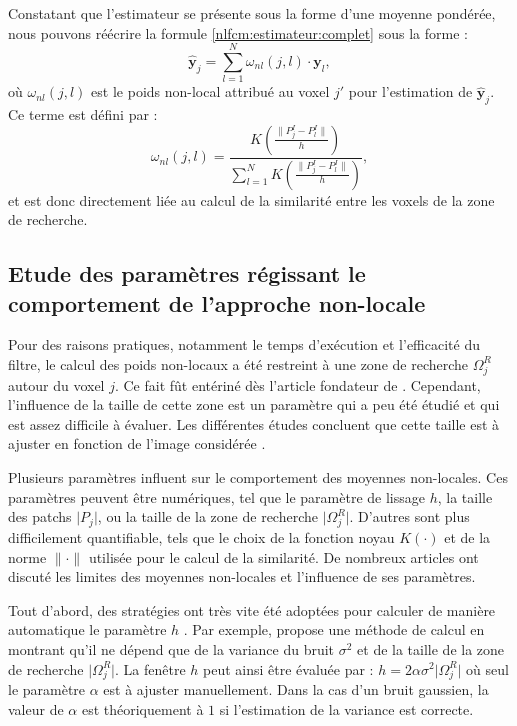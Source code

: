 Constatant que l'estimateur se présente sous la forme d'une moyenne pondérée, nous pouvons réécrire la formule \ref{nlfcm:estimateur:complet} sous la forme :
\begin{equation}
\mathbf{\hat{y}}_{j} = \sum_{l = 1}^{N}\omega_{nl}(j,l) \cdotp \mathbf{y}_{l} \label{nlfcm:estimateur:court},
\end{equation}
où $\omega_{nl}(j,l)$ est le poids non-local attribué au voxel $j'$ pour l'estimation de $\mathbf{\hat{y}}_{j}$. 
Ce terme est défini par :
\begin{equation}
\omega_{nl}(j,l) = \frac{K \left( \frac{\lVert P^{I}_{j} - P^{I}_{l} \rVert}{h} \right)}{\sum_{l=1}^{N} K \left(\frac{ \lVert P^{I}_{j} - P^{I}_{l} \rVert}{h} \right)} \label{nlfcm:poids:definition},
\end{equation}
et est donc directement liée au calcul de la similarité entre les voxels de la zone de recherche.

\subsection{Etude des paramètres régissant le comportement de l'approche non-locale}

Pour des raisons pratiques, notamment le temps d'exécution et l'efficacité du filtre, le calcul des poids non-locaux a été restreint à une zone de recherche $\Omega_{j}^{R}$ autour du voxel $j$.
Ce fait fût entériné dès l'article fondateur de \cite{Buades:MMS:2005}.
Cependant, l'influence de la taille de cette zone est un paramètre qui a peu été étudié et qui est assez difficile à évaluer.
Les différentes études concluent que cette taille est à ajuster en fonction de l'image considérée \cite{Salmon:2010}.

Plusieurs paramètres influent sur le comportement des moyennes non-locales. 
Ces paramètres peuvent être numériques, tel que le paramètre de lissage $h$, la taille des patchs $\lvert P_{j} \rvert$, ou la taille de la zone de recherche $\lvert \Omega^{R}_{j} \rvert$.
D'autres sont plus difficilement quantifiable, tels que le choix de la fonction noyau $K(\cdot)$ et de la norme $\lVert \cdot \rVert$ utilisée pour le calcul de la similarité.
De nombreux articles ont discuté les limites des moyennes non-locales et l'influence de ses paramètres.

Tout d'abord, des stratégies ont très vite été adoptées pour calculer de manière automatique le paramètre $h$ \cite{Tasdizen:ICIP:2008,Coupe:TMI:2008}. 
Par exemple, \cite{Coupe:TMI:2008} propose une méthode de calcul en montrant qu'il ne dépend que de la variance du bruit $\sigma^2$ et de la taille de la zone de recherche $\lvert \Omega^{R}_{j} \rvert$.
La fenêtre $h$ peut ainsi être évaluée par : $h = 2 \alpha \sigma^{2} \lvert \Omega^{R}_{j} \rvert$ où seul le paramètre $\alpha$ est à ajuster manuellement.
Dans la cas d'un bruit gaussien, la valeur de $\alpha$ est théoriquement à $1$ si l'estimation de la variance est correcte.

